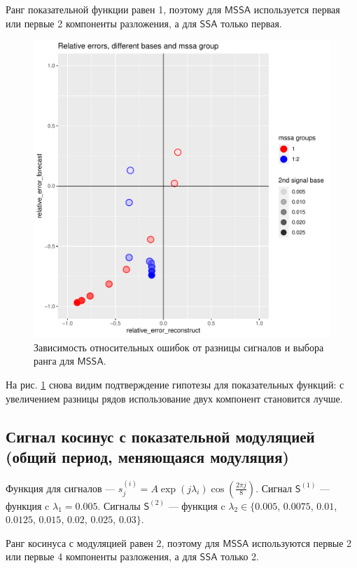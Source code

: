 \documentclass[specialist, substylefile = spbureport.rtx,
    subf,href,colorlinks=true, 12pt]{disser}
\newcommand{\sfS}{\mathsf{S}}
\newcommand{\SSA}{\mathsf{SSA}}
\newcommand{\MSSA}{\mathsf{MSSA}}
\begin{document}
        Ранг показательной функции равен 1, поэтому для $\MSSA$ используется первая или первые 2 компоненты разложения, а для $\SSA$ только первая.

        \begin{figure}[h]
            \centering
            \includegraphics[width=\textwidth]{experiment_1_exp.pdf}
            \caption{Зависимость относительных ошибок от разницы сигналов и выбора ранга для $\MSSA$.}
            \label{fig:exp1_exp}
        \end{figure}

        На рис. \ref{fig:exp1_exp} снова видим подтверждение гипотезы для показательных функций: с увеличением разницы рядов использование двух компонент становится лучше.

    \subsection{Сигнал косинус с показательной модуляцией (общий период, меняющаяся модуляция)}
        Функция для сигналов --- $s^{(i)}_j = A \exp(j\lambda_i) \cos(\frac{2\pi j}{8})$.
        Сигнал $\sfS^{(1)}$ --- функция c $\lambda_1 = 0.005$.
        Сигналы $\sfS^{(2)}$ --- функция c $\lambda_2 \in \{0.005$, $0.0075$, $0.01$, $0.0125$, $0.015$, $0.02$, $0.025$, $0.03\}$.

        Ранг косинуса с модуляцией равен 2, поэтому для $\MSSA$ используются первые 2 или первые 4 компоненты разложения, а для $\SSA$ только 2.
\end{document}
